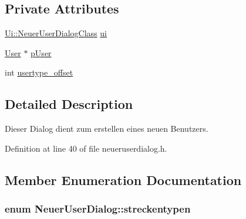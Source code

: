 \subsection*{Private Attributes}
\begin{CompactItemize}
\item 
\hyperlink{class_ui_1_1_neuer_user_dialog_class}{Ui::NeuerUserDialogClass} \hyperlink{class_neuer_user_dialog_3f6bb409584c450d6ca87973eb0c31b1}{ui}
\item 
\hyperlink{class_user}{User} $\ast$ \hyperlink{class_neuer_user_dialog_4f0a500dbb82eb6f8c7ca521aab8f332}{pUser}
\item 
int \hyperlink{class_neuer_user_dialog_acbf834639fcd4aef2b62f69ea594eac}{usertype\_\-offset}
\end{CompactItemize}


\subsection{Detailed Description}
Dieser Dialog dient zum erstellen eines neuen Benutzers. 

Definition at line 40 of file neueruserdialog.h.

\subsection{Member Enumeration Documentation}
\hypertarget{class_neuer_user_dialog_082ce8ccd9b1a7c9856445d43ce793cc}{
\subsubsection[streckentypen]{\setlength{\rightskip}{0pt plus 5cm}enum {\bf NeuerUserDialog::streckentypen}}}
\label{class_neuer_user_dialog_082ce8ccd9b1a7c9856445d43ce793cc}



